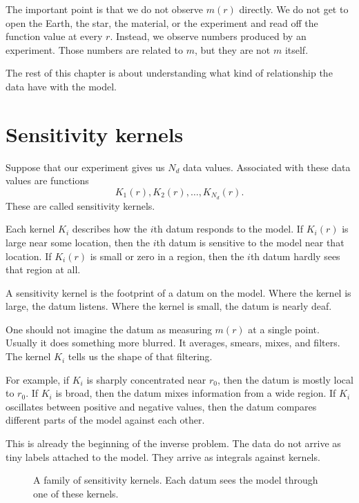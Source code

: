 \documentclass[11pt,openany]{book}
\theoremstyle{definition}
\theoremstyle{remark}
\begin{document}
The important point is that we do not observe \(m(r)\) directly. We do not get to open the
Earth, the star, the material, or the experiment and read off the function value at every \(r\).
Instead, we observe numbers produced by an experiment. Those numbers are related to \(m\),
but they are not \(m\) itself.

The rest of this chapter is about understanding what kind of relationship the data have with
the model.

\section{Sensitivity kernels}

Suppose that our experiment gives us \(N_d\) data values. Associated with these data values are
functions
\[
  K_1(r),K_2(r),\dots,K_{N_d}(r).
\]
These are called sensitivity kernels.

Each kernel \(K_i\) describes how the \(i\)th datum responds to the model. If \(K_i(r)\) is large
near some location, then the \(i\)th datum is sensitive to the model near that location. If
\(K_i(r)\) is small or zero in a region, then the \(i\)th datum hardly sees that region at all.

\begin{intuitionbox}
A sensitivity kernel is the footprint of a datum on the model. Where the kernel is large, the
datum listens. Where the kernel is small, the datum is nearly deaf.
\end{intuitionbox}

One should not imagine the datum as measuring \(m(r)\) at a single point. Usually it does
something more blurred. It averages, smears, mixes, and filters. The kernel \(K_i\) tells us the
shape of that filtering.

For example, if \(K_i\) is sharply concentrated near \(r_0\), then the datum is mostly local to
\(r_0\). If \(K_i\) is broad, then the datum mixes information from a wide region. If \(K_i\)
oscillates between positive and negative values, then the datum compares different parts of the
model against each other.

This is already the beginning of the inverse problem. The data do not arrive as tiny labels
attached to the model. They arrive as integrals against kernels.

\begin{figure}[ht]
  \centering
  \caption{A family of sensitivity kernels. Each datum sees the model through one of these
  kernels.}
  \label{fig:act1-sensitivity-kernels}
\end{figure}
\end{document}
